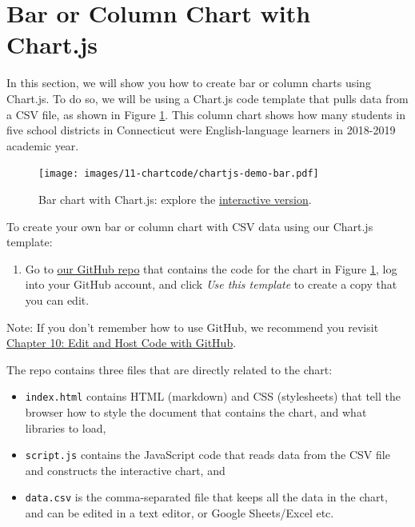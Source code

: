 \documentclass[
  english,
]{book}
\providecommand{\tightlist}{%
  \setlength{\itemsep}{0pt}\setlength{\parskip}{0pt}}
\begin{document}
\hypertarget{chartjs-bar-column}{%
\section*{Bar or Column Chart with Chart.js}\label{chartjs-bar-column}}

In this section, we will show you how to create bar or column charts using Chart.js. To do so, we will be using a Chart.js code template that pulls data from a CSV file, as shown in Figure \ref{fig:chartjs-demo-bar}. This column chart shows how many students in five school districts in Connecticut were English-language learners in 2018-2019 academic year.



\begin{figure}
\centering
\texttt{[image: images/11-chartcode/chartjs-demo-bar.pdf]}
\caption{\label{fig:chartjs-demo-bar}Bar chart with Chart.js: explore the \href{https://handsondataviz.github.io/chartjs-bar/index.html}{interactive version}.}
\end{figure}

To create your own bar or column chart with CSV data using our Chart.js template:

\begin{enumerate}
\def\labelenumi{\arabic{enumi}.}
\tightlist
\item
  Go to \href{https://github.com/HandsOnDataViz/chartjs-bar}{our GitHub repo} that contains the code for the chart in Figure \ref{fig:chartjs-demo-bar}, log into your GitHub account, and click \emph{Use this template} to create a copy that you can edit.
\end{enumerate}

Note: If you don't remember how to use GitHub, we recommend you revisit \href{github.html}{Chapter 10: Edit and Host Code with GitHub}.

The repo contains three files that are directly related to the chart:

\begin{itemize}
\tightlist
\item
  \texttt{index.html} contains HTML (markdown) and CSS (stylesheets) that tell the browser how to style the document that contains the chart, and what libraries to load,
\item
  \texttt{script.js} contains the JavaScript code that reads data from the CSV file and constructs the interactive chart, and
\item
  \texttt{data.csv} is the comma-separated file that keeps all the data in the chart, and can be edited in a text editor, or Google Sheets/Excel etc.
\end{itemize}
\end{document}
